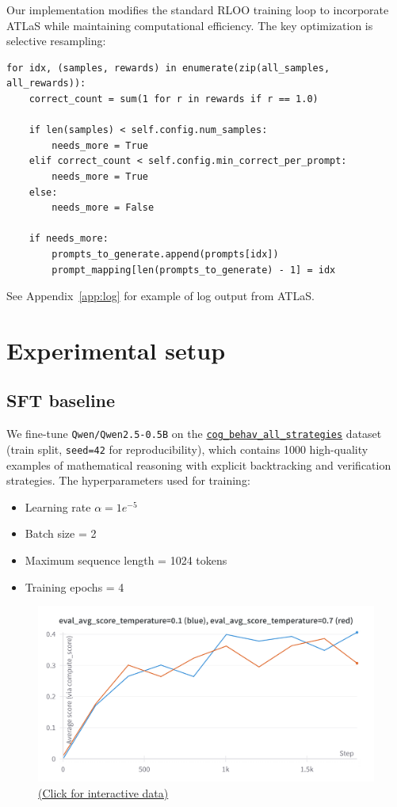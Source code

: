 \documentclass{article}
\begin{document}
Our implementation modifies the standard RLOO training loop to incorporate ATLaS while maintaining computational efficiency. The key optimization is selective resampling:

\begin{lstlisting}[style=python]
for idx, (samples, rewards) in enumerate(zip(all_samples, all_rewards)):
    correct_count = sum(1 for r in rewards if r == 1.0)
    
    if len(samples) < self.config.num_samples:
        needs_more = True
    elif correct_count < self.config.min_correct_per_prompt:
        needs_more = True
    else:
        needs_more = False
    
    if needs_more:
        prompts_to_generate.append(prompts[idx])
        prompt_mapping[len(prompts_to_generate) - 1] = idx
\end{lstlisting}

See Appendix~\ref{app:log} for example of log output from ATLaS.

\section{Experimental setup}

\subsection{SFT baseline}

We fine-tune \texttt{Qwen/Qwen2.5-0.5B} on the \texttt{\href{https://huggingface.co/datasets/Asap7772/cog_behav_all_strategies}{cog\_behav\_all\_strategies}} dataset (train split, \texttt{seed=42} for reproducibility), which contains 1000 high-quality examples of mathematical reasoning with explicit backtracking and verification strategies. The hyperparameters used for training:
\begin{itemize}
    \item Learning rate $\alpha = 1e^{-5}$
    \item Batch size = 2
    \item Maximum sequence length = 1024 tokens
    \item Training epochs = 4
\end{itemize}

\begin{figure}[H]
  \centering
  \includegraphics[width=0.8\columnwidth]{images/sft.png}
  \vspace{-10pt}
  \caption*{\href{https://wandb.ai/jonathanalgar/cs224r-project-sft-baseline/runs/d6osiygw/panel/w5ubogq9o}{(Click for interactive data)}}
\end{figure}
\end{document}
